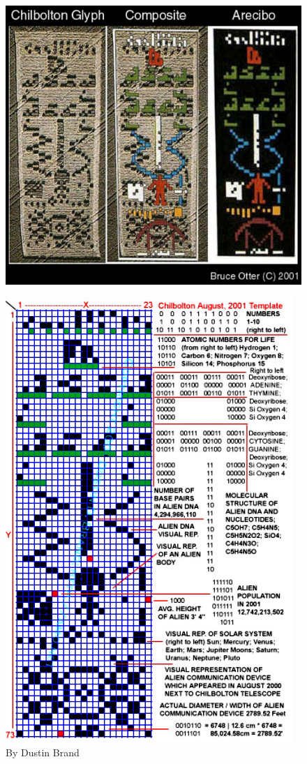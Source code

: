 \documentclass{report}
\begin{document}
\begin{figure}
  \includegraphics{photograph/chibolton-arceibo-comparison.jpg}
\label{chi:comparison}
\end{figure}
\begin{figure}
  \includegraphics{photograph/chibolton-analysis.jpg}
\caption{By Dustin Brand\cite{contact}}
\label{chi:analysis}
\end{figure}
\end{document}
